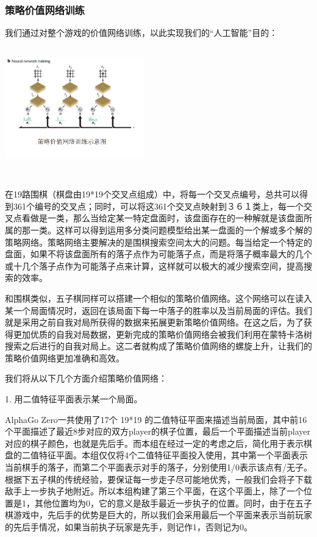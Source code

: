 \documentclass[a4paper]{article}
\begin{document}
\begin{multicols}{2}
\subsubsection{策略价值网络训练}
我们通过对整个游戏的价值网络训练，以此实现我们的“人工智能”目的：
\includegraphics[width=6cm,height=6cm]{AI2.png}
\par
在19路围棋（棋盘由19*19个交叉点组成）中，将每一个交叉点编号，总共可以得到361个编号的交叉点；同时，可以将这361个交叉点映射到３６１类上，每一个交叉点看做是一类，那么当给定某一特定盘面时，该盘面存在的一种解就是该盘面所属的那一类。这样可以得到运用多分类问题模型给出某一盘面的一个解或多个解的策略网络。策略网络主要解决的是围棋搜索空间太大的问题。每当给定一个特定的盘面，如果不将该盘面所有的落子点作为可能落子点，而是将落子概率最大的几个或十几个落子点作为可能落子点来计算，这样就可以极大的减少搜索空间，提高搜索的效率。\cite{AI1}\par
和围棋类似，五子棋同样可以搭建一个相似的策略价值网络。这个网络可以在读入某一个局面情况时，返回在该局面下每一中落子的胜率以及当前局面的评估。我们就是采用之前自我对局所获得的数据来拓展更新策略价值网络。在这之后，为了获得更加优质的自我对局数据，更新完成的策略价值网络会被我们利用在蒙特卡洛树搜索之后进行的自我对局上。这二者就构成了策略价值网络的螺旋上升，让我们的策略价值网络更加准确和高效。\par
我们将从以下几个方面介绍策略价值网络：\par
1. 用二值特征平面表示某一个局面。\par
AlphaGo Zero一共使用了17个 19*19 的二值特征平面来描述当前局面，其中前16个平面描述了最近8步对应的双方player的棋子位置，最后一个平面描述当前player对应的棋子颜色，也就是先后手。\cite{AI2}而本组在经过一定的考虑之后，简化用于表示棋盘的二值特征平面。本组仅仅将4个二值特征平面投入使用，其中第一个平面表示当前棋手的落子，而第二个平面表示对手的落子，分别使用1/0表示该点有/无子。 根据下五子棋的传统经验，要保证每一步走子尽可能地优秀，一般我们会将子下载敌手上一步执子地附近。所以本组构建了第三个平面，在这个平面上，除了一个位置是1，其他位置均为0，它的意义是敌手最近一步执子的位置。同时，由于在五子棋游戏中，先后手的优势是巨大的，所以我们会采用最后一个平面来表示当前玩家的先后手情况，如果当前执子玩家是先手，则记作1，否则记为0。\par

\end{multicols}
\end{document}
